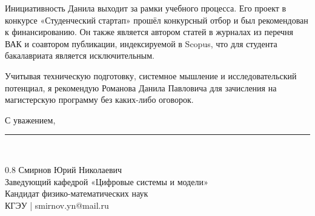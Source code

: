 \documentclass[a4paper,12pt]{article}
\begin{document}
Инициативность Данила выходит за рамки учебного процесса. Его проект в конкурсе «Студенческий стартап» прошёл конкурсный отбор и был рекомендован к финансированию. Он также является автором статей в журналах из перечня ВАК и соавтором публикации, индексируемой в Scopus, что для студента бакалавриата является исключительным.

Учитывая техническую подготовку, системное мышление и исследовательский потенциал, я рекомендую Романова Данила Павловича для зачисления на магистерскую программу без каких-либо оговорок.

\vspace{10pt}
\noindent С уважением,

\vspace{15pt}
\rule{5cm}{0.4pt}\\[4pt]
\begin{spacing}{0.8}
  {Смирнов Юрий Николаевич}\\
  {\small Заведующий кафедрой «Цифровые системы и модели»}\\
  {\small Кандидат физико-математических наук}\\
  {\small КГЭУ | smirnov.yn@mail.ru}
\end{spacing}
\end{document}
